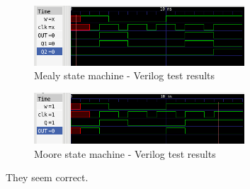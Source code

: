 \begin{figure}[H]
    \begin{centering}
    \includegraphics[width=0.7\textwidth]{data/Graficos3/3a.png}
    \par\end{centering}
    \caption{Mealy state machine - Verilog test results}
\end{figure}

\begin{figure}[H]
    \begin{centering}
    \includegraphics[width=0.7\textwidth]{data/Graficos3/3b.png}
    \par\end{centering}
    \caption{Moore state machine - Verilog test results}
\end{figure}

They seem correct.



